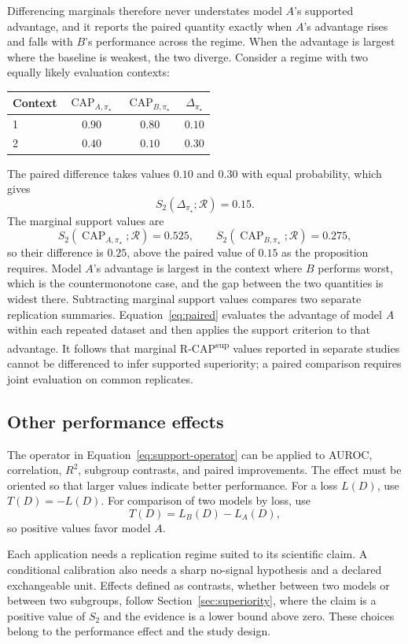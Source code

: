 \documentclass[11pt]{article}
\newcommand{\CAP}{\operatorname{CAP}}
\newcommand{\Regime}{\mathcal{R}}
\theoremstyle{remark}
\begin{document}
Differencing marginals therefore never understates model $A$'s supported advantage, and it reports the paired quantity exactly when $A$'s advantage rises and falls with $B$'s performance across the regime. When the advantage is largest where the baseline is weakest, the two diverge. Consider a regime with two equally likely evaluation contexts:
\begin{center}
\begin{tabular}{@{}lccc@{}}
\toprule
Context & $\CAP_{A,\pi_\star}$ & $\CAP_{B,\pi_\star}$ & $\Delta_{\pi_\star}$ \\
\midrule
1 & $0.90$ & $0.80$ & $0.10$ \\
2 & $0.40$ & $0.10$ & $0.30$ \\
\bottomrule
\end{tabular}
\end{center}
The paired difference takes values $0.10$ and $0.30$ with equal probability, which gives
\[
S_2(\Delta_{\pi_\star};\Regime)=0.15.
\]
The marginal support values are
\[
S_2(\CAP_{A,\pi_\star};\Regime)=0.525,
\qquad
S_2(\CAP_{B,\pi_\star};\Regime)=0.275,
\]
so their difference is $0.25$, above the paired value of $0.15$ as the proposition requires. Model $A$'s advantage is largest in the context where $B$ performs worst, which is the countermonotone case, and the gap between the two quantities is widest there. Subtracting marginal support values compares two separate replication summaries. Equation~\eqref{eq:paired} evaluates the advantage of model $A$ within each repeated dataset and then applies the support criterion to that advantage. It follows that marginal R-CAP\textsuperscript{sup} values reported in separate studies cannot be differenced to infer supported superiority; a paired comparison requires joint evaluation on common replicates.

\subsection{Other performance effects}

The operator in Equation~\eqref{eq:support-operator} can be applied to AUROC, correlation, $R^2$, subgroup contrasts, and paired improvements. The effect must be oriented so that larger values indicate better performance. For a loss $L(D)$, use $T(D)=-L(D)$. For comparison of two models by loss, use
\[
T(D)=L_B(D)-L_A(D),
\]
so positive values favor model $A$.

Each application needs a replication regime suited to its scientific claim. A conditional calibration also needs a sharp no-signal hypothesis and a declared exchangeable unit. Effects defined as contrasts, whether between two models or between two subgroups, follow Section~\ref{sec:superiority}, where the claim is a positive value of $S_2$ and the evidence is a lower bound above zero. These choices belong to the performance effect and the study design.
\end{document}
